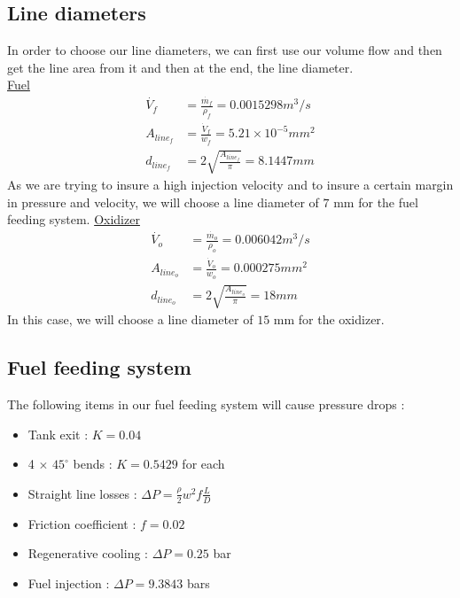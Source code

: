 \subsection{Line diameters}
In order to choose our line diameters, we can first use our volume flow and then get the line area from it and then at the end, the line diameter.\\
\underline{Fuel} 
\begin{align}
\dot{V_f}&= \frac{\dot{m_f}}{\rho_f} = 0.0015298m^3/s\\
A_{line_f} &= \frac{\dot V_f}{w_f}=5.21\times 10^{-5} mm^2\\
d_{line_f} &= 2\sqrt{\frac{A_{line_f}}{\pi}} = 8.1447mm
\end{align}
As we are trying to insure a high injection velocity and to insure a certain margin in pressure and velocity, we will choose a line diameter of $7$ mm for the fuel feeding system.
\underline{Oxidizer}
\begin{align}
\dot{V_o}&= \frac{\dot{m_o}}{\rho_o} = 0.006042m^3/s\\
A_{line_o} &= \frac{\dot V_o}{w_o}=0.000275 mm^2\\
d_{line_o} &= 2\sqrt{\frac{A_{line_o}}{\pi}} = 18mm
\end{align}
In this case, we will choose a line diameter of $15$ mm for the oxidizer.

\subsection{Fuel feeding system}
The following items in our fuel feeding system will cause pressure drops :
\begin{itemize}
	\item Tank exit : $K=0.04$
	\item 4 $\times$ $45^\circ$ bends : $K = 0.5429$ for each
	\item Straight line losses : $\Delta P = \frac \rho 2 w^2 f \frac{L}{D}$
	\item Friction coefficient : $f = 0.02$
	\item Regenerative cooling : $\Delta P = 0.25$ bar
	\item Fuel injection : $\Delta P = 9.3843$ bars
\end{itemize}

